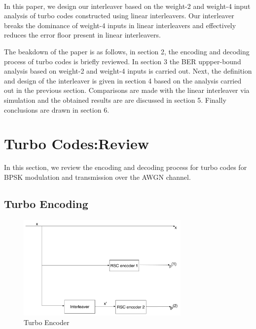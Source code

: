 \documentclass[20 pts]{article}
\begin{document}
\paragraph{}
In this paper, we design our interleaver based on the weight-2 and weight-4 input
analysis of turbo codes constructed using linear interleavers. Our interleaver
breaks the dominance of weight-4 inputs in linear interleavers and effectively reduces
the error floor present in linear interleavers.

The beakdown of the paper is as follows, in section 2, the 
encoding and decoding process of turbo codes is briefly reviewed. In section 3 the 
BER uppper-bound analysis based on weight-2 and weight-4 inputs is carried out. 
Next, the definition and design of the 
interleaver is given in section 4 based on the analysis carried out in the previous 
section.
 Comparisons are made with the linear interleaver via simulation
and the obtained results are are discussed in
section 5. Finally conclusions are drawn in section 6.
\section{Turbo Codes:Review}
In this section, we review the encoding and decoding process for turbo codes for BPSK
modulation and transmission over the AWGN channel.
	
\subsection{Turbo Encoding}

\begin{figure}[h!]
\centering
		\includegraphics[width=0.75\textwidth]{TurboEncoder.pdf}
		\caption{Turbo Encoder}
		\label{TC}
		\end{figure}
	
\end{document}
